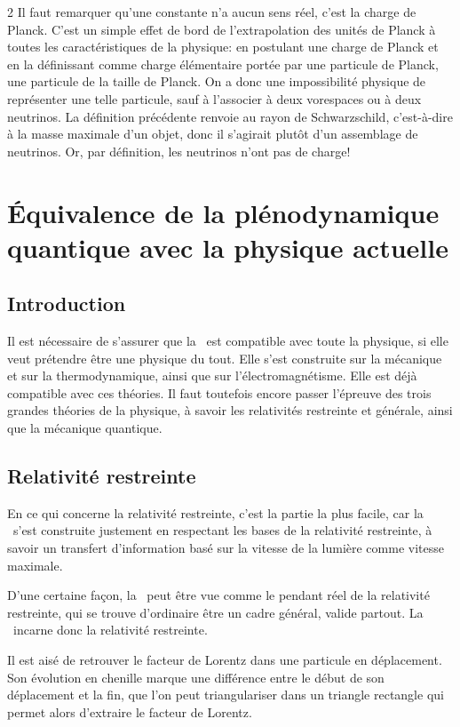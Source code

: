 \begin{multicols}{2}
Il faut remarquer qu'une constante n'a aucun sens réel, c'est la
charge de Planck. C'est un simple effet de bord de l'extrapolation des
unités de Planck à toutes les caractéristiques de la physique: en
postulant une charge de Planck et en la définissant comme charge
élémentaire portée par une particule de Planck, une particule de la
taille de Planck. On a donc une impossibilité physique de représenter
une telle particule, sauf à l'associer à deux vorespaces ou à deux
neutrinos. La définition précédente renvoie au rayon de Schwarzschild,
c'est-à-dire à la masse maximale d'un objet, donc il s'agirait plutôt
d'un assemblage de neutrinos. Or, par définition, les neutrinos n'ont
pas de charge!

\section{Équivalence de la plénodynamique quantique avec la physique actuelle}

\subsection{Introduction} 

Il est nécessaire de s'assurer que la \PQ\  est compatible avec toute la
physique, si elle veut prétendre être une physique du tout. Elle s'est
construite sur la mécanique et sur la thermodynamique, ainsi que
sur l'électromagnétisme. Elle est déjà compatible avec ces théories.
Il faut toutefois encore passer l'épreuve des trois grandes théories
de la physique, à savoir les relativités restreinte et générale, ainsi que
la mécanique quantique.

\subsection{Relativité restreinte}

En ce qui concerne la relativité restreinte, c'est la partie la plus
facile, car la \PQ\ s'est construite justement en respectant les bases de
la relativité restreinte, à savoir un transfert d'information basé
sur la vitesse de la lumière comme vitesse maximale.

D'une certaine façon, la \PQ\ peut être vue comme le pendant réel de la
relativité restreinte, qui se trouve d'ordinaire être un cadre
général, valide partout. La \PQ\ incarne donc la relativité restreinte.

Il est aisé de retrouver le facteur de Lorentz dans une particule en
déplacement. Son évolution en chenille marque une différence entre le
début de son déplacement et la fin, que l'on peut triangulariser dans
un triangle rectangle qui permet alors d'extraire le facteur de
Lorentz.


\end{multicols}
